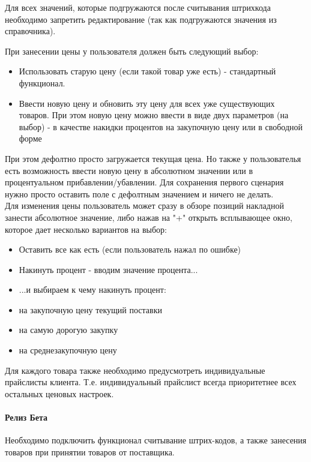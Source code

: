 \documentclass[DIV=calc, paper=a4, fontsize=11pt]{scrartcl} %
\begin{document}
Для всех значений, которые подгружаются после считывания штрихкода необходимо запретить редактирование (так как подгружаются значения из справочника).

При занесении цены у пользователя должен быть следующий выбор:
\begin{itemize}
	\item Использовать старую цену (если такой товар уже есть) - стандартный функционал.
	\item Ввести новую цену и обновить эту цену для всех уже существующих товаров. При этом новую цену можно ввести в виде двух параметров (на выбор) - в качестве накидки процентов на закупочную цену или в свободной форме 
\end{itemize}
При этом дефолтно просто загружается текущая цена. Но также у пользователья есть возможность ввести новую цену в абсолютном значении или в процентуальном прибавлении/убавлении. Для сохранения первого сценария нужно просто оставить поле с дефолтным значением и ничего не делать. 
\\[0.5cm]
Для изменения цены пользователь может сразу в обзоре позиций накладной занести абсолютное значение, либо нажав на "+" открыть всплывающее окно, которое дает несколько вариантов на выбор:

\begin{itemize}
	\item Оставить все как есть (если пользователь нажал по ошибке)
	\item Накинуть процент - вводим значение процента...
	\item ...и выбираем к чему накинуть процент:
	\item на закупочную цену текущий поставки
	\item на самую дорогую закупку
	\item на среднезакупочную цену
\end{itemize}


Для каждого товара также необходимо предусмотреть индивидуальные прайслисты клиента. Т.е. индивидуальный прайслист всегда приоритетнее всех остальных ценовых настроек.
\paragraph{Релиз Бета}
Необходимо подключить функционал считывание штрих-кодов, а также занесения товаров при принятии товаров от поставщика.
\end{document}
